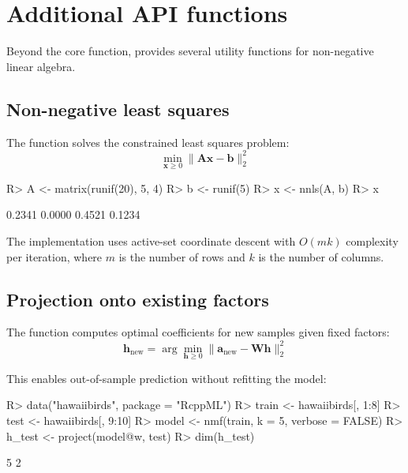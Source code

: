\documentclass[article]{jss_modified}
\newcommand{\fct}[1]{\code{#1()}}
\begin{document}
\section{Additional API functions} \label{sec:api}

Beyond the core \fct{nmf} function,  provides several utility 
functions for non-negative linear algebra.

\subsection{Non-negative least squares}

The \fct{nnls} function solves the constrained least squares problem:
\begin{equation}
  \min_{\mathbf{x} \geq 0} \|\mathbf{A}\mathbf{x} - \mathbf{b}\|_2^2
\end{equation}

\begin{CodeChunk}
\begin{CodeInput}
R> A <- matrix(runif(20), 5, 4)
R> b <- runif(5)
R> x <- nnls(A, b)
R> x
\end{CodeInput}
\begin{CodeOutput}
[1] 0.2341 0.0000 0.4521 0.1234
\end{CodeOutput}
\end{CodeChunk}

The implementation uses active-set coordinate descent with $O(mk)$ complexity 
per iteration, where $m$ is the number of rows and $k$ is the number of columns.

\subsection{Projection onto existing factors}

The \fct{project} function computes optimal coefficients for new samples given 
fixed factors:
\begin{equation}
  \mathbf{h}_{\text{new}} = \arg\min_{\mathbf{h} \geq 0} \|\mathbf{a}_{\text{new}} - \mathbf{W}\mathbf{h}\|_2^2
\end{equation}

This enables out-of-sample prediction without refitting the model:

\begin{CodeChunk}
\begin{CodeInput}
R> data("hawaiibirds", package = "RcppML")
R> train <- hawaiibirds[, 1:8]
R> test <- hawaiibirds[, 9:10]
R> model <- nmf(train, k = 5, verbose = FALSE)
R> h_test <- project(model@w, test)
R> dim(h_test)
\end{CodeInput}
\begin{CodeOutput}
[1] 5 2
\end{CodeOutput}
\end{CodeChunk}
\end{document}
